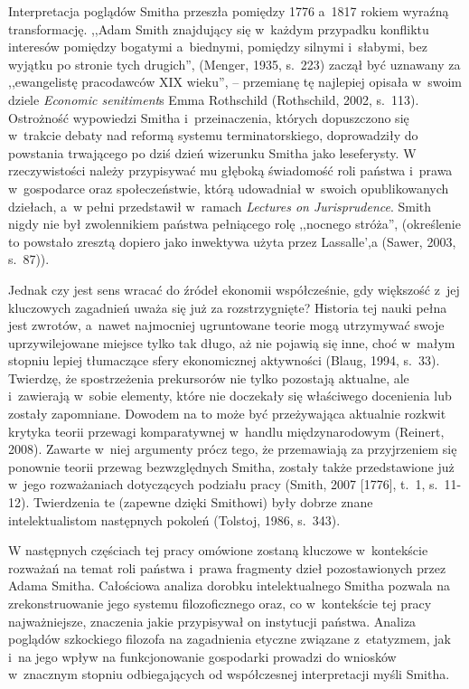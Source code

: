 Interpretacja poglądów Smitha przeszła pomiędzy 1776 a~1817 rokiem wyraźną transformację. ,,Adam Smith znajdujący się w~każdym przypadku konfliktu interesów pomiędzy bogatymi a~biednymi, pomiędzy silnymi i~słabymi, bez wyjątku po stronie tych drugich'', \label{ref:RNDsAFNZfRokB}(Menger, 1935, s.~223) zaczął być uznawany za ,,ewangelistę pracodawców XIX wieku'', -- przemianę tę najlepiej opisała w~swoim dziele \textit{Economic senitiment}s Emma Rothschild \label{ref:RNDs0eUTXaI1v}(Rothschild, 2002, s.~113). Ostrożność wypowiedzi Smitha i~przeinaczenia, których dopuszczono się w~trakcie debaty nad reformą systemu terminatorskiego, doprowadziły do powstania trwającego po dziś dzień wizerunku Smitha jako leseferysty. W rzeczywistości należy przypisywać mu głęboką świadomość roli państwa i~prawa w~gospodarce oraz społeczeństwie, którą udowadniał w~swoich opublikowanych dziełach, a~w pełni przedstawił w~ramach \textit{Lectures on Jurisprudence}. Smith nigdy nie był zwolennikiem państwa pełniącego rolę ,,nocnego stróża'', (określenie to powstało zresztą dopiero jako inwektywa użyta przez Lassalle',a \label{ref:RNDPvkhPhffGM}(Sawer, 2003, s.~87)).

Jednak czy jest sens wracać do źródeł ekonomii współcześnie, gdy większość z~jej kluczowych zagadnień uważa się już za rozstrzygnięte? Historia tej nauki pełna jest zwrotów, a~nawet najmocniej ugruntowane teorie mogą utrzymywać swoje uprzywilejowane miejsce tylko tak długo, aż nie pojawią się inne, choć w~małym stopniu lepiej tłumaczące sfery ekonomicznej aktywności \label{ref:RNDIzKebFVZYU}(Blaug, 1994, s.~33). Twierdzę, że spostrzeżenia prekursorów nie tylko pozostają aktualne, ale i~zawierają w~sobie elementy, które nie doczekały się właściwego docenienia lub zostały zapomniane. Dowodem na to może być przeżywająca aktualnie rozkwit krytyka teorii przewagi komparatywnej w~handlu międzynarodowym \label{ref:RNDCycJKXS8KA}(Reinert, 2008). Zawarte w~niej argumenty prócz tego, że przemawiają za przyjrzeniem się ponownie teorii przewag bezwzględnych Smitha, zostały także przedstawione już w~jego rozważaniach dotyczących podziału pracy \label{ref:RNDtOabovEKbm}(Smith, 2007 [1776], t.~1, s.~11-12). Twierdzenia te (zapewne dzięki Smithowi) były dobrze znane intelektualistom następnych pokoleń \label{ref:RND8shRFO5Ofw}(Tolstoj, 1986, s.~343).

W następnych częściach tej pracy omówione zostaną kluczowe w~kontekście rozważań na temat roli państwa i~prawa fragmenty dzieł pozostawionych przez Adama Smitha. Całościowa analiza dorobku intelektualnego Smitha pozwala na zrekonstruowanie jego systemu filozoficznego oraz, co w~kontekście tej pracy najważniejsze, znaczenia jakie przypisywał on instytucji państwa. Analiza poglądów szkockiego filozofa na zagadnienia etyczne związane z~etatyzmem, jak i~na jego wpływ na funkcjonowanie gospodarki prowadzi do wniosków w~znacznym stopniu odbiegających od współczesnej interpretacji myśli Smitha.

